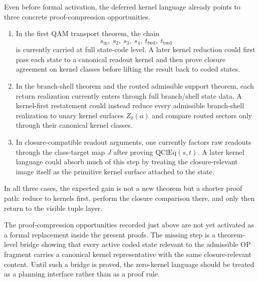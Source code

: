 \begin{remark}\label{rem:qam-zero-proof-opportunities}
Even before formal activation, the deferred kernel language already points to three concrete proof-compression opportunities.
\begin{enumerate}
\item In the first QAM transport theorem, the chain
\[
s_{\mathrm{in}},\ s_2,\ s_3,\ s_4,\ t_{\mathrm{fwd}},\ t_{\mathrm{bwd}}
\]
is currently carried at full state-code level. A later kernel reduction could first pass each state to a canonical readout kernel and then prove closure agreement on kernel classes before lifting the result back to coded states.
\item In the branch-shell theorem and the routed admissible support theorem, each return realization currently enters through full branch/shell state data. A kernel-first restatement could instead reduce every admissible branch-shell realization to unary kernel surfaces $Z_0(a)$ and compare routed sectors only through their canonical kernel classes.
\item In closure-compatible readout arguments, one currently factors raw readouts through the class-target map $J$ after proving $\mathrm{QClEq}(s,t)$. A later kernel language could absorb much of this step by treating the closure-relevant image itself as the primitive kernel surface attached to the state.
\end{enumerate}
In all three cases, the expected gain is not a new theorem but a shorter proof path: reduce to kernels first, perform the closure comparison there, and only then return to the visible tuple layer.
\end{remark}

\begin{remark}\label{rem:qam-zero-current-limit}
The proof-compression opportunities recorded just above are not yet activated as a formal replacement inside the present proofs. The missing step is a theorem-level bridge showing that every active coded state relevant to the admissible OP fragment carries a canonical kernel representative with the same closure-relevant content. Until such a bridge is proved, the zero-kernel language should be treated as a planning interface rather than as a proof rule.
\end{remark}



